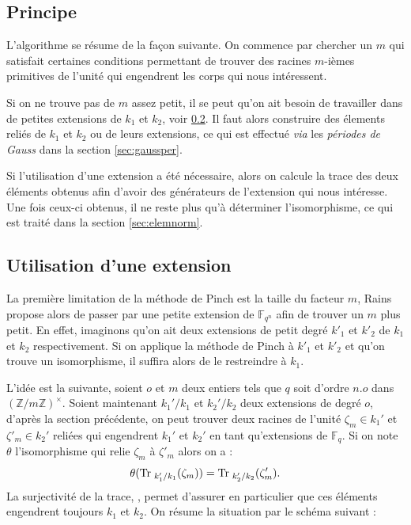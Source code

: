 \documentclass[a4paper]{article} %
\numberwithin{section}{part}
\numberwithin{equation}{section}
\newcommand\zmodninv[1]{(\mathbb{Z}/#1\mathbb{Z})^{\times}}
\newcommand\GF[1]{\mathbb{F}_{#1}}
\begin{document}
\subsection{Principe}

L'algorithme se résume de la façon suivante. On commence par chercher un $m$ qui
satisfait certaines conditions permettant de trouver des racines $m$-ièmes
primitives de l'unité qui engendrent les corps qui nous intéressent.\par
Si on ne trouve pas de $m$ assez petit, il se peut qu'on ait besoin de
travailler dans de petites extensions de $k_1$ et $k_2$, voir
\ref{sec:extension}. Il faut alors construire des élements reliés de $k_1$ et 
$k_2$ ou de leurs extensions, ce qui est effectué \textit{via} les 
\emph{périodes de Gauss} dans la section \ref{sec:gaussper}.\par
Si l'utilisation d'une extension a été nécessaire, alors on calcule la trace des
deux éléments obtenus afin d'avoir des générateurs de l'extension qui nous
intéresse. Une fois ceux-ci obtenus, il ne reste plus qu'à déterminer
l'isomorphisme, ce qui est traité dans la section \ref{sec:elemnorm}.

\subsection{Utilisation d'une extension}
\label{sec:extension}
La première limitation de la méthode de Pinch est la taille du facteur
$m$, Rains propose \cite{Rai} alors  de passer par une petite
extension de $\GF{q^n}$ afin de trouver un $m$ plus petit. En effet, imaginons 
qu'on ait deux extensions de petit degré $k'_1$ et $k'_2$ de $k_1$ et $k_2$ 
respectivement. Si on applique la méthode de Pinch à $k'_1$ et $k'_2$ et 
qu'on trouve un isomorphisme, il suffira alors de le restreindre à $k_1$.\par
L'idée est la suivante, soient $o$ et $m$ deux entiers tels que $q$ soit d'ordre
$n.o$ dans $\zmodninv{m}$. Soient maintenant $k_1'/k_1$ et $k_2'/k_2$ deux
extensions de degré $o$, d'après la section précédente, on peut trouver deux
racines de l'unité $\zeta_m\in k_1'$ et $\zeta'_m\in k_2'$ reliées qui 
engendrent $k_1'$ et $k_2'$ en tant qu'extensions de $\GF{q}$. Si on note
$\theta$ l'isomorphisme qui relie $\zeta_m$ à $\zeta'_m$ alors on a : 
\begin{equation}
\theta(\textup{Tr\;}_{k'_1/k_1}(\zeta_{m})) =
\textup{Tr\;}_{k'_2/k_2}(\zeta'_{m}).
\end{equation}
La surjectivité de la trace, \cite[Chap. VI, th. 2.5]{Lan1}, permet d'assurer en
particulier que ces éléments engendrent toujours $k_1$ et $k_2$. On résume la 
situation par le schéma suivant :
\end{document}
